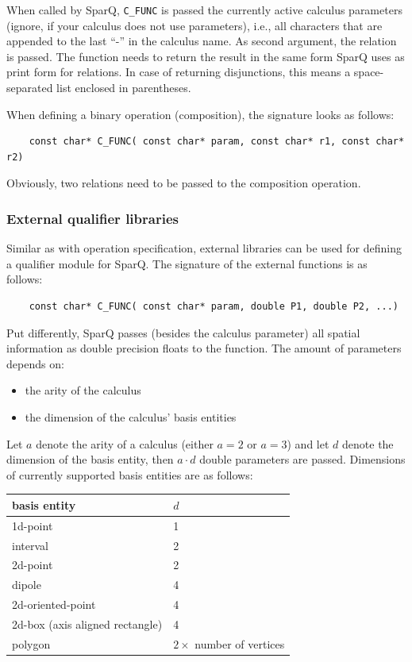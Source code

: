 \documentclass[headsepline]{scrreprt}
\theoremstyle{definition}
\newcommand{\engine}{SparQ}
\begin{document}
When called by \engine{}, \verb=C_FUNC= is passed the currently active calculus parameters (ignore, if your calculus does not use parameters), i.e., all characters that are appended to the last ``-'' in the calculus name. As second argument, the relation is passed. The function needs to return the result in the same form \engine{} uses as print form for relations. In case of returning disjunctions, this means a space-separated list enclosed in parentheses.

When defining a binary operation (composition), the signature looks as follows:

\begin{verbatim}
	const char* C_FUNC( const char* param, const char* r1, const char* r2)
\end{verbatim}

Obviously, two relations need to be passed to the composition operation.

\subsubsection{External qualifier libraries}

Similar as with operation specification, external libraries can be used for defining
a qualifier module for \engine{}. The signature of the external functions is as
follows:

\begin{verbatim}
	const char* C_FUNC( const char* param, double P1, double P2, ...)
\end{verbatim}

Put differently, \engine{} passes (besides the calculus parameter) all spatial information as double precision floats to the function. The amount of parameters depends on:
\begin{itemize}
	\item the arity of the calculus
	\item the dimension of the calculus' basis entities
\end{itemize}

Let $a$ denote the arity of a calculus (either $a=2$ or $a=3$) and let $d$ denote the dimension of the basis entity, then $a\cdot d$ double parameters are passed. Dimensions of currently supported basis entities are as follows:

\begin{center}
\begin{tabular}{|ll|}\hline
	basis entity & $d$\\ \hline \hline
	1d-point & 1\\
	interval & 2\\
	2d-point & 2\\
	dipole & 4\\
	2d-oriented-point & 4\\
	2d-box (axis aligned rectangle) & 4 \\
	polygon & $2\times$ number of vertices
	\\ \hline
\end{tabular}
\end{center}
\end{document}
